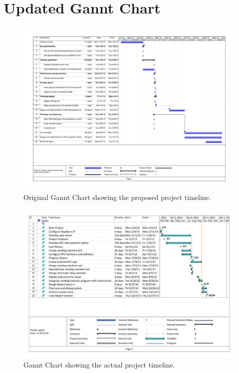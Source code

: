 \chapter{Updated Gannt Chart}
\label{app:c}

\begin{figure}
 \centering 
 \includegraphics[clip=true, trim = 20 50 0 0,
 scale=0.6]{old_gantt}
 \caption{Original Gannt Chart showing the proposed project timeline.}
 \label{fig:gannt_old}
\end{figure}

\newpage

\begin{figure}
 \centering 
 \includegraphics[clip=true, trim = 20 0 0 0,
 scale=0.6]{gantt}
 \caption{Gannt Chart showing the actual project timeline.}
 \label{fig:gannt}
\end{figure}